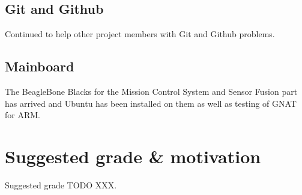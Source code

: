 \subsection{Git and Github}
Continued to help other project members with Git and Github problems.

\subsection{Mainboard}
The BeagleBone Blacks for the Mission Control System and Sensor Fusion part
has arrived and Ubuntu has been installed on them as well as testing of GNAT
for ARM.

\section{Suggested grade \& motivation}
Suggested grade TODO XXX.
